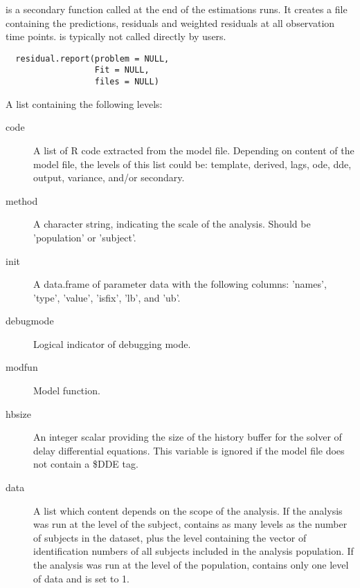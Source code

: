 %
\begin{Description}\relax
{} is a secondary function called at the end of the 
estimations runs. It creates a file containing the predictions, residuals and
weighted residuals at all observation time points.  is 
typically not called directly by users.
\end{Description}
%
\begin{Usage}
\begin{verbatim}
  residual.report(problem = NULL,
                  Fit = NULL,
                  files = NULL)
\end{verbatim}
\end{Usage}
%
\begin{Arguments}
\begin{ldescription}
\item[\code{problem}] A list containing the following levels:\begin{description}

\item[code] A list of R code extracted from the model file. Depending on 
content of the model file, the levels of this list could be: template,
derived, lags, ode, dde, output, variance, and/or secondary.
\item[method] A character string, indicating the scale of the analysis. Should
be 'population' or 'subject'.
\item[init] A data.frame of parameter data with the following columns:
'names', 'type', 'value', 'isfix', 'lb', and 'ub'.
\item[debugmode] Logical indicator of debugging mode.
\item[modfun] Model function.
\item[hbsize] An integer scalar providing the size of the history buffer for
the solver of delay differential equations. This variable is ignored if
the model file does not contain a \$DDE tag.
\item[data] A list which content depends on the scope of the analysis. If 
the analysis was run at the level of the subject,  contains as 
many levels as the number of subjects in the dataset, plus the 
level containing the vector of identification numbers of all subjects 
included in the analysis population. If the analysis was run at the level 
of the population,  contains only one level of data and 
 is set to 1.


\end{description}
\end{ldescription}
\end{Arguments}
